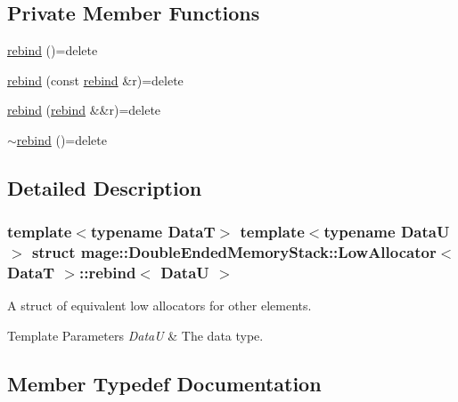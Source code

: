 \subsection*{Private Member Functions}
\begin{DoxyCompactItemize}
\item 
\hyperlink{structmage_1_1_double_ended_memory_stack_1_1_low_allocator_1_1rebind_a0614241d4b05d08ab4bba55ca793bf5c}{rebind} ()=delete
\item 
\hyperlink{structmage_1_1_double_ended_memory_stack_1_1_low_allocator_1_1rebind_a83aa74b68f3d51f517aa872af16f3712}{rebind} (const \hyperlink{structmage_1_1_double_ended_memory_stack_1_1_low_allocator_1_1rebind}{rebind} \&r)=delete
\item 
\hyperlink{structmage_1_1_double_ended_memory_stack_1_1_low_allocator_1_1rebind_a3d180ba2f831083dd8850b7f05c10b32}{rebind} (\hyperlink{structmage_1_1_double_ended_memory_stack_1_1_low_allocator_1_1rebind}{rebind} \&\&r)=delete
\item 
\hyperlink{structmage_1_1_double_ended_memory_stack_1_1_low_allocator_1_1rebind_a54b1fa630e8a021ced000f950748f707}{$\sim$rebind} ()=delete
\end{DoxyCompactItemize}


\subsection{Detailed Description}
\subsubsection*{template$<$typename DataT$>$\newline
template$<$typename DataU$>$\newline
struct mage\+::\+Double\+Ended\+Memory\+Stack\+::\+Low\+Allocator$<$ Data\+T $>$\+::rebind$<$ Data\+U $>$}

A struct of equivalent low allocators for other elements.


\begin{DoxyTemplParams}{Template Parameters}
{\em DataU} & The data type. \\
\hline
\end{DoxyTemplParams}


\subsection{Member Typedef Documentation}
\hypertarget{structmage_1_1_double_ended_memory_stack_1_1_low_allocator_1_1rebind_ad2d30609df172b2f8759819439a41bfd}{}\label{structmage_1_1_double_ended_memory_stack_1_1_low_allocator_1_1rebind_ad2d30609df172b2f8759819439a41bfd} 
